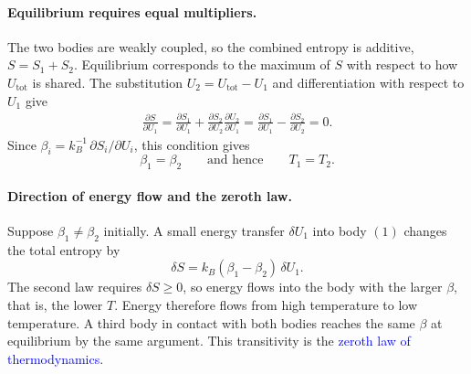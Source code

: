 \paragraph{Equilibrium requires equal multipliers.}
The two bodies are weakly coupled, so the combined entropy is additive,
$S=S_1+S_2$. Equilibrium corresponds to the maximum of $S$ with respect to
how $U_{\text{tot}}$ is shared. The substitution $U_2=U_{\text{tot}}-U_1$
and differentiation with respect to $U_1$ give
\begin{align*}
    \frac{\partial S}{\partial U_1}
    = \frac{\partial S_1}{\partial U_1}
    +\frac{\partial S_2}{\partial U_2}\frac{\partial U_2}{\partial U_1}
    = \frac{\partial S_1}{\partial U_1}-\frac{\partial S_2}{\partial U_2}=0.
\end{align*}
Since $\beta_i=k_B^{-1}\,\partial S_i/\partial U_i$, this condition gives
\begin{equation}
    \boxed{\beta_1=\beta_2 \qquad\text{and hence}\qquad T_1=T_2.}
\end{equation}

\paragraph{Direction of energy flow and the zeroth law.}
Suppose $\beta_1\neq\beta_2$ initially. A small energy transfer $\delta U_1$
into body $(1)$ changes the total entropy by
\begin{equation*}
    \delta S = k_B(\beta_1-\beta_2)\,\delta U_1.
\end{equation*}
The second law requires $\delta S\geq0$, so energy flows into the body with
the larger $\beta$, that is, the lower $T$. Energy therefore flows from high
temperature to low temperature. A third body in contact with both bodies
reaches the same $\beta$ at equilibrium by the same argument. This
transitivity is the \textcolor{blue}{zeroth law of thermodynamics}.

